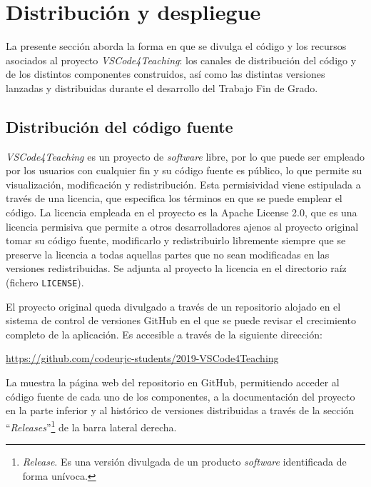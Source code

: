 \section{Distribución y despliegue}
\label{sec:distribDespliegue}

La presente sección aborda la forma en que se divulga el código y los recursos asociados al proyecto \textit{VSCode4Teaching}: los canales de distribución del código y de los distintos componentes construidos, así como las distintas versiones lanzadas y distribuidas durante el desarrollo del Trabajo Fin de Grado.

\subsection{Distribución del código fuente}
\textit{VSCode4Teaching} es un proyecto de \textit{software} libre, por lo que puede ser empleado por los usuarios con cualquier fin y su código fuente es público, lo que permite su visualización, modificación y redistribución. Esta permisividad viene estipulada a través de una licencia, que especifica los términos en que se puede emplear el código. La licencia empleada en el proyecto es la Apache License 2.0, que es una licencia permisiva que permite a otros desarrolladores ajenos al proyecto original tomar su código fuente, modificarlo y redistribuirlo libremente siempre que se preserve la licencia a todas aquellas partes que no sean modificadas en las versiones redistribuidas. Se adjunta al proyecto la licencia en el directorio raíz (fichero \texttt{LICENSE}).

El proyecto original queda divulgado a través de un repositorio alojado en el sistema de control de versiones GitHub en el que se puede revisar el crecimiento completo de la aplicación. Es accesible a través de la siguiente dirección:

\vspace{-0.5\baselineskip}
\begin{center}
    \href{https://github.com/codeurjc-students/2019-VSCode4Teaching}{https://github.com/codeurjc-students/2019-VSCode4Teaching}
\end{center}
\vspace{-0.5\baselineskip}

La  muestra la página web del repositorio en GitHub, permitiendo acceder al código fuente de cada uno de los componentes, a la documentación del proyecto en la parte inferior y al histórico de versiones distribuidas a través de la sección ``\textit{Releases}''\footnote{\textit{Release}. Es una versión divulgada de un producto \textit{software} identificada de forma unívoca.} de la barra lateral derecha.


